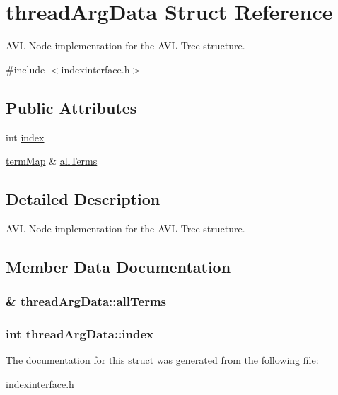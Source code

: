 \hypertarget{structthread_arg_data}{}\section{thread\+Arg\+Data Struct Reference}
\label{structthread_arg_data}


A\+V\+L Node implementation for the A\+V\+L Tree structure.  




{\ttfamily \#include $<$indexinterface.\+h$>$}

\subsection*{Public Attributes}
\begin{DoxyCompactItemize}
\item 
int \hyperlink{structthread_arg_data_a4e6f861158b648e1879aa43da7516102}{index}
\item 
\hyperlink{docparser_8h_a9b942645c404d380838be4078b0199d9}{term\+Map} \& \hyperlink{structthread_arg_data_a2172136d6a60921ea13a6b0ceefd0585}{all\+Terms}
\end{DoxyCompactItemize}


\subsection{Detailed Description}
A\+V\+L Node implementation for the A\+V\+L Tree structure. 

\subsection{Member Data Documentation}
\hypertarget{structthread_arg_data_a2172136d6a60921ea13a6b0ceefd0585}{}
\subsubsection[{all\+Terms}]{\& thread\+Arg\+Data\+::all\+Terms}\label{structthread_arg_data_a2172136d6a60921ea13a6b0ceefd0585}
\hypertarget{structthread_arg_data_a4e6f861158b648e1879aa43da7516102}{}
\subsubsection[{index}]{\setlength{\rightskip}{0pt plus 5cm}int thread\+Arg\+Data\+::index}\label{structthread_arg_data_a4e6f861158b648e1879aa43da7516102}


The documentation for this struct was generated from the following file\+:\begin{DoxyCompactItemize}
\item 
\hyperlink{indexinterface_8h}{indexinterface.\+h}\end{DoxyCompactItemize}
